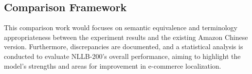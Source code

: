 \documentclass[sigconf]{acmart}
\begin{document}
\subsection{Comparison Framework}
This comparison work would focuses on semantic equivalence and terminology appropriateness between the experiment results and the existing Amazon Chinese version. Furthermore, discrepancies are documented, and a statistical analysis is conducted to evaluate NLLB-200's overall performance, aiming to highlight the model's strengths and areas for improvement in e-commerce localization.


 
\end{document}
